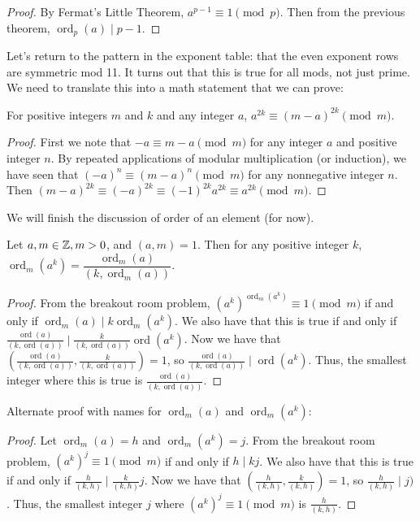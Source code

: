 \documentclass[letterpaper, 11 pt]{article}
\newcommand{\ord}{\operatorname{ord}}
\begin{document}
\begin{proof}
 By Fermat's Little Theorem, $a^{p-1}\equiv 1 \pmod p$. Then from the previous theorem, $\ord_p(a)\mid p-1$.
\end{proof}



Let's return to the pattern in the exponent table: that the even exponent rows are symmetric mod 11. It turns out that this is true for all mods, not just prime. We need to translate this into a math statement that we can prove:
\begin{thm} For positive integers $m$ and $k$ and any integer $a$, 
 $a^{2k}\equiv (m-a)^{2k} \pmod m$.
\end{thm}
\begin{proof}
 First we note that $-a\equiv m-a \pmod m$ for any integer $a$ and positive integer $n$. By repeated applications of modular multiplication (or induction), we have seen that $(-a)^n\equiv (m-a)^n \pmod m$ for any nonnegative integer $n$. Then $(m-a)^{2k}\equiv (-a)^{2k}\equiv (-1)^{2k}a^{2k}\equiv a^{2k}\pmod m$.
\end{proof}

We will finish the discussion of order of an element (for now).
\begin{thm}
 Let $a,m\in\mathbb Z, m>0$, and $(a,m)=1$. Then for any positive integer $k$, $\ord_m(a^k)=\dfrac{\ord_m(a)}{(k,\ord_m(a))}$.
\end{thm}
\begin{proof}
From the breakout room problem, $(a^k)^{\ord_m(a^k)}\equiv 1 \pmod m$ if and only if $\ord_m(a)\mid k\ord_m(a^k)$. We also have that this is true if and only if $\frac{\ord(a)}{(k, \ord(a))}\mid\frac{k}{(k,\ord(a))}\ord(a^k)$. Now we have that $\left(\frac{\ord(a)}{(k, \ord(a))},\frac{k}{(k,\ord(a))}\right)=1$, so $\frac{\ord(a)}{(k, \ord(a))}\mid\ord(a^k)$. Thus, the smallest integer where this is true is $\frac{\ord(a)}{(k, \ord(a))}$.
\end{proof}
Alternate proof with names for $\ord_m(a)$ and $\ord_m(a^k)$:
\begin{proof} Let $\ord_m(a)=h$ and $\ord_m(a^k)=j$.
From the breakout room problem, $(a^k)^{j}\equiv 1 \pmod m$ if and only if $h\mid kj$. We also have that this is true if and only if $\frac{h}{(k, h)}\mid\frac{k}{(k,h)}j$. Now we have that $\left(\frac{h}{(k, h)},\frac{k}{(k,h)}\right)=1$, so $\frac{h}{(k,h)}\mid j)$. Thus, the smallest integer $j$ where $(a^k)^j\equiv 1 \pmod m$ is $\frac{h}{(k,h)}$.
\end{proof}
\end{document}
